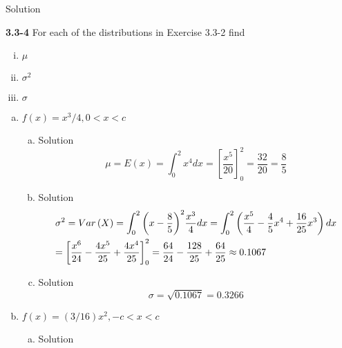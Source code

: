 \documentclass{article}
\begin{document}
\begin{spacing}{1.1}
\begin{homeworkProblem}
\begin{enumerate}[(a)]
\begin{enumerate}[(a)]
\begin{homeworkSection}{Solution}
					\end{homeworkSection}
			\end{enumerate}
	\end{enumerate}
\end{homeworkProblem}
\begin{homeworkProblem}
	{\bf 3.3-4}	For each of the distributions in Exercise 3.3-2 find 
		\begin{enumerate}[(i)]
		\item $\mu$
		\item $\sigma^2$
		\item $\sigma$
	\end{enumerate}
	\begin{enumerate}[(a)]
		\item $f(x) = x^3/4, 0 < x < c$
			\begin{enumerate}[(a)]
				\item
					\begin{homeworkSection}{Solution}
						\[\mu  = E\left( x \right) = \int_0^2 {{x^4}} dx = \left[ {\frac{{{x^5}}}{{20}}} \right]_0^2 = \frac{{32}}{{20}} = \frac{8}{5}\]
					\end{homeworkSection}
				\item
					\begin{homeworkSection}{Solution}
						\[\begin{gathered}
						  {\sigma ^2} = Var\left( X \right) = \int_0^2 {{{\left( {x - \frac{8}{5}} \right)}^2}\frac{{{x^3}}}{4}dx}  = \int_0^2 {\left( {\frac{{{x^5}}}{4} - \frac{4}{5}{x^4} + \frac{{16}}{{25}}{x^3}} \right)dx}  \hfill \\
						   = \left[ {\frac{{{x^6}}}{{24}} - \frac{{4{x^5}}}{{25}} + \frac{{4{x^4}}}{{25}}} \right]_0^2 = \frac{{64}}{{24}} - \frac{{128}}{{25}} + \frac{{64}}{{25}} \approx 0.1067 \hfill \\ 
						\end{gathered} \]
					\end{homeworkSection}
				\item
					\begin{homeworkSection}{Solution}
						\[\sigma  = \sqrt {0.1067}  = 0.3266\]
					\end{homeworkSection}
			\end{enumerate}				
		\item $f(x) = (3/16)x^2, -c < x < c$
			\begin{enumerate}[(a)]
				\item
					\begin{homeworkSection}{Solution}

\end{homeworkSection}
\end{enumerate}
\end{enumerate}
\end{homeworkProblem}
\end{spacing}
\end{document}
